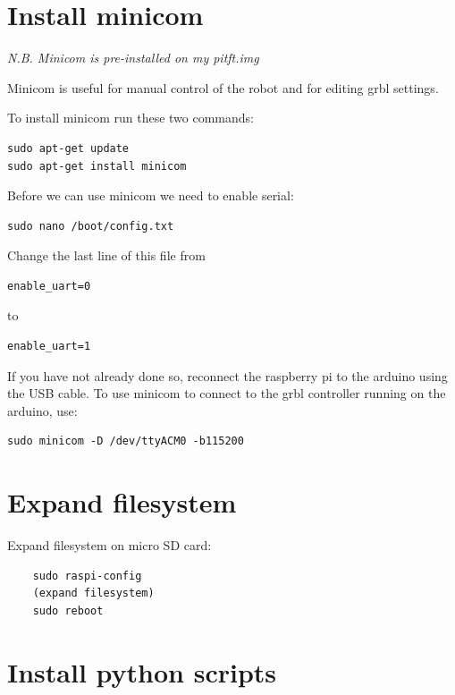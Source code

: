 \documentclass[
]{book}
\begin{document}
\hypertarget{install-minicom}{%
\section{Install minicom}\label{install-minicom}}

\emph{N.B. Minicom is pre-installed on my pitft.img}

Minicom is useful for manual control of the robot and for editing grbl settings.

To install minicom run these two commands:

\begin{verbatim}
sudo apt-get update
sudo apt-get install minicom
\end{verbatim}

Before we can use minicom we need to enable serial:

\begin{verbatim}
sudo nano /boot/config.txt
\end{verbatim}

Change the last line of this file from

\begin{verbatim}
enable_uart=0
\end{verbatim}

to

\begin{verbatim}
enable_uart=1
\end{verbatim}

If you have not already done so, reconnect the raspberry pi to the arduino using the USB cable. To use minicom to connect to the grbl controller running on the arduino, use:

\begin{verbatim}
sudo minicom -D /dev/ttyACM0 -b115200
\end{verbatim}

\hypertarget{expand-filesystem}{%
\section{Expand filesystem}\label{expand-filesystem}}

Expand filesystem on micro SD card:

\begin{verbatim}
    sudo raspi-config
    (expand filesystem)
    sudo reboot
\end{verbatim}

\hypertarget{installScripts}{%
\section{Install python scripts}\label{installScripts}}
\end{document}
